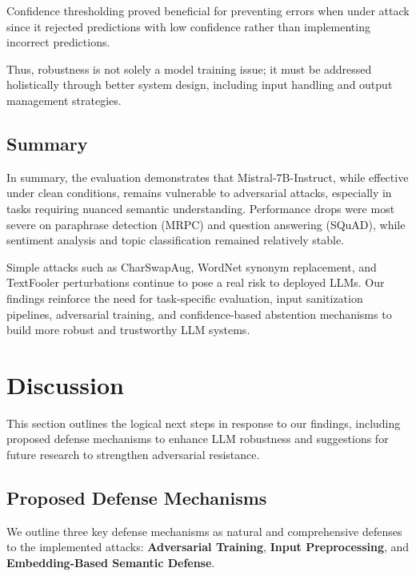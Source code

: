 \documentclass[conference]{IEEEtran}
\begin{document}
Confidence thresholding proved beneficial for preventing errors when under attack since it rejected predictions with low confidence rather than implementing incorrect predictions.

Thus, robustness is not solely a model training issue; it must be addressed holistically through better system design, including input handling and output management strategies.


\subsection{Summary}


In summary, the evaluation demonstrates that Mistral-7B-Instruct, while effective under clean conditions, remains vulnerable to adversarial attacks, especially in tasks requiring nuanced semantic understanding.  
Performance drops were most severe on paraphrase detection (MRPC) and question answering (SQuAD), while sentiment analysis and topic classification remained relatively stable.

Simple attacks such as CharSwapAug, WordNet synonym replacement, and TextFooler perturbations continue to pose a real risk to deployed LLMs.  
Our findings reinforce the need for task-specific evaluation, input sanitization pipelines, adversarial training, and confidence-based abstention mechanisms to build more robust and trustworthy LLM systems.


\section{Discussion}

This section outlines the logical next steps in response to our findings, including proposed defense mechanisms to enhance LLM robustness and suggestions for future research to strengthen adversarial resistance.

\subsection{Proposed Defense Mechanisms}

We outline three key defense mechanisms as natural and comprehensive defenses to the implemented attacks: \textbf{Adversarial Training}, \textbf{Input Preprocessing}, and \textbf{Embedding-Based Semantic Defense}.
\end{document}
